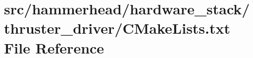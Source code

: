 \hypertarget{hardware__stack_2thruster__driver_2CMakeLists_8txt}{}\section{src/hammerhead/hardware\+\_\+stack/thruster\+\_\+driver/\+C\+Make\+Lists.txt File Reference}
\label{hardware__stack_2thruster__driver_2CMakeLists_8txt}
